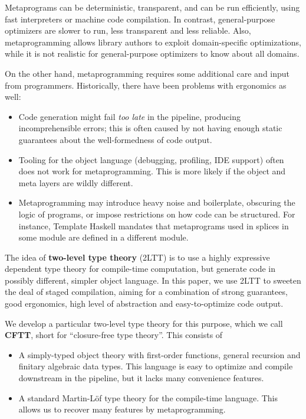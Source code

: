 \documentclass[acmsmall,screen,review,anonymous]{acmart}
\theoremstyle{remark}
\begin{document}
Metaprograms can be deterministic, transparent, and can be run efficiently,
using fast interpreters or machine code compilation. In contrast,
general-purpose optimizers are slower to run, less transparent and less
reliable. Also, metaprogramming allows library authors to exploit
domain-specific optimizations, while it is not realistic for general-purpose
optimizers to know about all domains.

On the other hand, metaprogramming requires some additional care and input from
programmers. Historically, there have been problems with ergonomics as well:
\begin{itemize}
\item Code generation might fail \emph{too late} in the pipeline, producing
      incomprehensible errors; this is often caused by not having enough static
      guarantees about the well-formedness of code output.
\item Tooling for the object language (debugging, profiling, IDE support) often does not
      work for metaprogramming. This is more likely if the object and meta layers are wildly
      different.
\item Metaprogramming may introduce heavy noise and boilerplate, obscuring the logic of
      programs, or impose restrictions on how code can be structured. For instance,
      Template Haskell mandates that metaprograms used in splices in some module are
      defined in a different module.
\end{itemize}

The idea of \textbf{two-level type theory} (2LTT) is to use a highly expressive
dependent type theory for compile-time computation, but generate code in
possibly different, simpler object language. In this paper, we use 2LTT to sweeten the
deal of staged compilation, aiming for a combination of strong guarantees, good
ergonomics, high level of abstraction and easy-to-optimize code output.

We develop a particular two-level type theory for this purpose, which we
call \textbf{CFTT}, short for ``closure-free type theory''. This consists
of
\begin{itemize}
\item A simply-typed object theory with first-order functions, general recursion and
      finitary algebraic data types. This language is easy to optimize and compile
      downstream in the pipeline, but it lacks many convenience features.
\item A standard Martin-Löf type theory for the compile-time language. This
      allows us to recover many features by metaprogramming.
\end{itemize}
\end{document}
